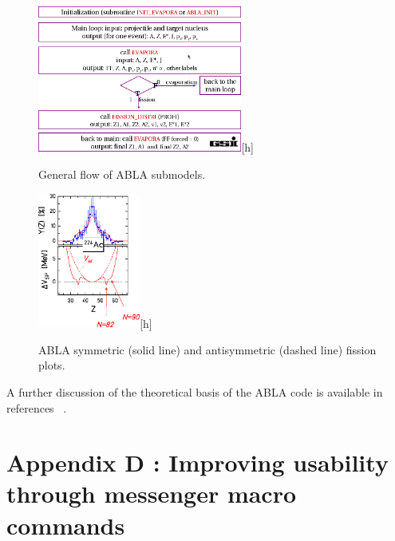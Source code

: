 
\begin{figure}[h] 
\begin{center}
\includegraphics[width=0.6\textwidth]{images/AblaTable.png}[h]  
\caption{\label{fig:ablatable} General flow of ABLA submodels.}
 
 \end{center}
 \end{figure}
\begin{figure}[h] 
\begin{center}
\includegraphics[width=0.3\textwidth]{images/AblaHumps.png}[h]  
\caption{\label{fig:ablahumps} ABLA symmetric (solid line) and antisymmetric (dashed line) fission plots.}
 
 \end{center}
 \end{figure}

A further discussion of the theoretical basis of the ABLA code is available in references ~\cite{ablatalk,iia}.

\clearpage

\section*{Appendix D \label{AppendixD}: Improving usability through messenger macro commands}

